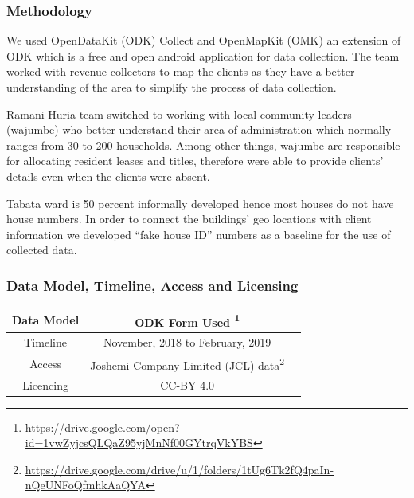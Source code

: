 \documentclass[a4paper,12pt,twoside]{article}
\begin{document}
\subsubsection{Methodology}
\begin{multicols}{2}


We used OpenDataKit (ODK) Collect and OpenMapKit (OMK) an extension of ODK which is a free and open android application for data collection. The team worked with revenue collectors to map the clients as they have a better understanding of the area to simplify the process of data collection. 

Ramani Huria team switched to working with local community leaders (wajumbe) who better understand their area of administration which normally ranges from 30 to 200 households. Among other things, wajumbe  are responsible for allocating resident leases and titles, therefore were able to provide clients’ details even when the clients were absent.

Tabata ward is 50 percent informally developed hence most houses do not have house numbers. In order to connect the buildings’ geo locations with client information we developed “fake house ID” numbers as a baseline for the use of collected data.

\end{multicols}
\medskip
\subsubsection{Data Model, Timeline, Access and Licensing}
\begin{center}
\begin{tabular}{|c|c|c|}  
 \hline
Data Model &
      \href{https://drive.google.com/open?id=1vwZyjcsQLQaZ95yjMnNf00GYtrqVkYBS}{ODK Form Used} \footnote{\url{https://drive.google.com/open?id=1vwZyjcsQLQaZ95yjMnNf00GYtrqVkYBS}} \\
 \hline
  Timeline  &  November, 2018 to February, 2019 \\
\hline  
 Access  & 
   \href{https://drive.google.com/drive/u/1/folders/1tUg6Tk2fQ4paIn-nQeUNFoQfmhkAaQYA}{Joshemi Company Limited (JCL) data}\footnote{\url{https://drive.google.com/drive/u/1/folders/1tUg6Tk2fQ4paIn-nQeUNFoQfmhkAaQYA}} \\
   
\hline 
    Licencing & CC-BY 4.0 \\
\hline
\end{tabular}
\end{center}
\end{document}
